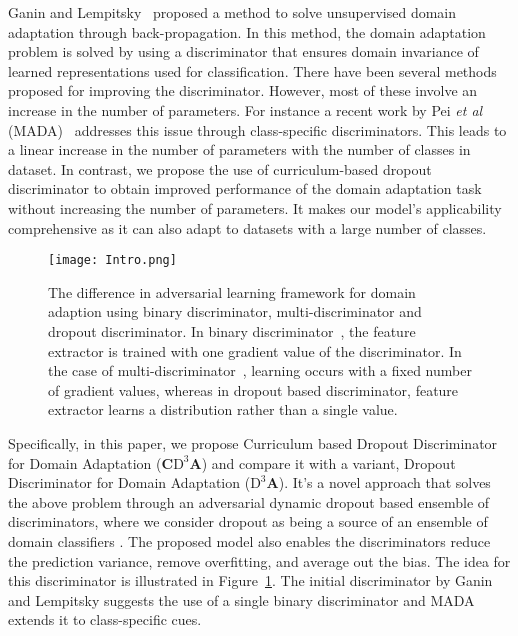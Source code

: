 \documentclass{bmvc2k}
\begin{document}
Ganin and Lempitsky~\cite{ganin_ICML2015} proposed a method to solve unsupervised domain adaptation through back-propagation. In this method, the domain adaptation problem is solved by using a discriminator that ensures domain invariance of learned representations used for classification. There have been several methods \cite{tzeng_CVPR2017, hoffman_arxiv2017,shen_arxiv2017} proposed for improving the discriminator. However, most of these involve an increase in the number of parameters. For instance a recent work by Pei \textit{et al} (MADA)~\cite{pei_arxiv2018} addresses this issue through class-specific discriminators. This leads to a linear increase in the number of parameters with the number of classes in  dataset. In contrast, we propose the use of curriculum-based dropout discriminator to obtain improved performance of the domain adaptation task without increasing the number of parameters. It makes our model's applicability comprehensive as it can also adapt to datasets with a large number of classes.
\begin{figure}
 \centering
    \texttt{[image: Intro.png]}
      \caption{The difference in adversarial learning framework for domain adaption using binary discriminator, multi-discriminator and dropout discriminator. In binary discriminator~\cite{ganin_ICML2015}, the feature extractor is trained with one gradient value of the discriminator. In the case of multi-discriminator~\cite{pei_arxiv2018}, learning occurs with a fixed number of gradient values, whereas in dropout based discriminator, feature extractor learns a distribution rather than a single value. }
      \label{fig:intro}
      \vspace{-1.2em}
 \end{figure}
Specifically, in this paper, we propose Curriculum based Dropout Discriminator for Domain Adaptation (\textbf{C$\text{D}^{3}$A}) and compare it with a variant, Dropout Discriminator for Domain Adaptation (\textbf{$\text{D}^{3}$A}).  It's a novel approach that solves the above problem through an adversarial dynamic dropout based ensemble of discriminators,  where we consider dropout as being a source of an ensemble of domain classifiers \cite{hara2016analysis}. The proposed model also enables the discriminators reduce the prediction variance, remove overfitting, and average out the bias. The idea for this discriminator is illustrated in Figure~\ref{fig:intro}. The initial discriminator by Ganin and Lempitsky \cite{ganin_ICML2015} suggests the use of a single binary discriminator and MADA~\cite{pei_arxiv2018} extends it to class-specific cues. 
\end{document}
